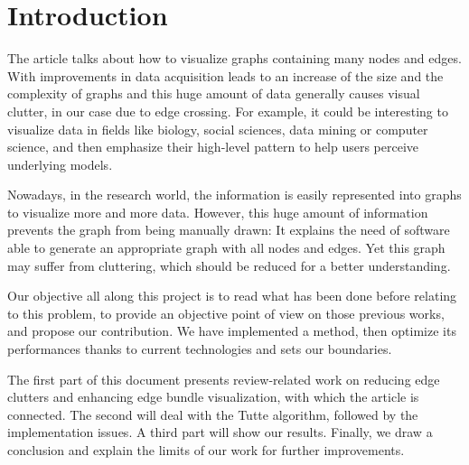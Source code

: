 \chapter*{Introduction}

The article talks about how to visualize graphs containing many nodes and edges. With improvements in data acquisition leads to an increase of the size and the complexity of graphs and this huge amount of data generally causes visual clutter, in our case due to edge crossing.
For example, it could be interesting to visualize data in fields like biology, social sciences, data mining or computer science, and then emphasize their high-level pattern to help users perceive underlying models.


Nowadays, in the research world, the information is easily represented into graphs to visualize more and more data. However, this huge amount of information prevents the graph from being manually drawn:  It explains the need of software able to generate an appropriate graph with all nodes and edges. Yet this graph may suffer from cluttering, which should be reduced for a better understanding.

Our objective all along this project is to read what has been done before relating to this problem, to provide an objective point of view on those previous works, and propose our contribution. We have implemented a method, then optimize its performances thanks to current technologies and sets our boundaries. 


The first part of this document presents review-related work on reducing edge clutters and enhancing edge bundle visualization, with which the article is connected. The second will deal with the Tutte algorithm, followed by the implementation issues. A third part will show our results. Finally, we draw a conclusion and explain the limits of our work for further improvements.
